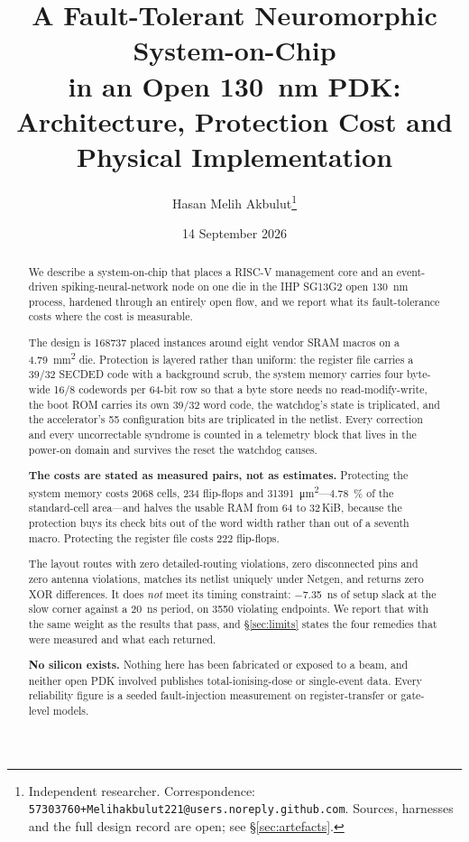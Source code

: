 \documentclass[11pt,a4paper]{article}
\title{A Fault-Tolerant Neuromorphic System-on-Chip\\
in an Open \SI{130}{\nano\meter} PDK:\\
\large Architecture, Protection Cost and Physical Implementation}
\author{Hasan Melih Akbulut\thanks{Independent researcher.
Correspondence: \texttt{57303760+Melihakbulut221@users.noreply.github.com}.
Sources, harnesses and the full design record are open; see
\S\ref{sec:artefacts}.}}
\date{14 September 2026}
\begin{document}
\maketitle

\begin{abstract}
We describe a system-on-chip that places a RISC-V management core and an
event-driven spiking-neural-network node on one die in the IHP SG13G2
open \SI{130}{\nano\meter} process, hardened through an entirely open
flow, and we report what its fault-tolerance costs where the cost is
measurable.

The design is \num{168737} placed instances around eight vendor SRAM
macros on a \SI{4.79}{\milli\meter\squared} die. Protection is layered
rather than uniform: the register file carries a \num{39}/\num{32}
SECDED code with a background scrub, the system memory carries four
byte-wide \num{16}/\num{8} codewords per \num{64}-bit row so that a byte
store needs no read-modify-write, the boot ROM carries its own
\num{39}/\num{32} word code, the watchdog's state is triplicated, and the
accelerator's \num{55} configuration bits are triplicated in the netlist.
Every correction and every uncorrectable syndrome is counted in a
telemetry block that lives in the power-on domain and survives the reset
the watchdog causes.

\textbf{The costs are stated as measured pairs, not as estimates.}
Protecting the system memory costs \num{2068} cells, \num{234}
flip-flops and \SI{31391}{\um\squared}---\SI{4.78}{\percent} of
the standard-cell area---and halves the usable RAM from \num{64} to
\num{32}\,KiB, because the protection buys its check bits out of the
word width rather than out of a seventh macro. Protecting the register
file costs \num{222} flip-flops.

The layout routes with zero detailed-routing violations, zero
disconnected pins and zero antenna violations, matches its netlist
uniquely under Netgen, and returns zero XOR differences. It does
\emph{not} meet its timing constraint: \SI{-7.35}{\nano\second} of setup
slack at the slow corner against a \SI{20}{\nano\second} period, on
\num{3550} violating endpoints. We report that with the same weight as
the results that pass, and \S\ref{sec:limits} states the four remedies
that were measured and what each returned.

\textbf{No silicon exists.} Nothing here has been fabricated or exposed
to a beam, and neither open PDK involved publishes total-ionising-dose or
single-event data. Every reliability figure is a seeded fault-injection
measurement on register-transfer or gate-level models.
\end{abstract}
\end{document}
